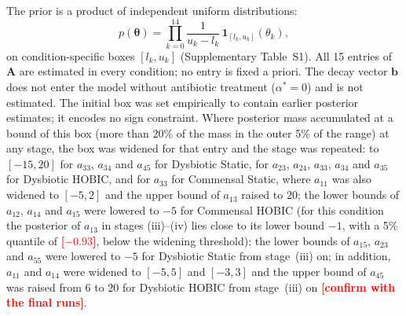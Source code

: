 \documentclass[11pt,a4paper]{article}
\newcommand{\btheta}{\boldsymbol{\theta}}
\newcommand{\TBD}[1]{\textcolor{red}{\textbf{[#1]}}}
\begin{document}
The prior is a product of independent uniform distributions:
\begin{equation}
p(\btheta) = \prod_{k=0}^{14} \frac{1}{u_k-l_k}\,\mathbf{1}_{[l_k,u_k]}(\theta_k),
\label{eq:prior}
\end{equation}
on condition-specific boxes $[l_k,u_k]$ (Supplementary Table~S1).
All 15 entries of $\mathbf{A}$ are estimated in every condition; no entry is fixed a priori.
The decay vector $\mathbf{b}$ does not enter the model without antibiotic treatment ($\alpha^*=0$) and is not estimated.
The initial box was set empirically to contain earlier posterior estimates; it encodes no sign constraint. Where posterior mass accumulated at a bound of this box (more than 20\% of the mass in the outer 5\% of the range) at any stage, the box was widened for that entry and the stage was repeated: to $[-15,20]$ for $a_{33}$, $a_{34}$ and $a_{45}$ for Dysbiotic Static, for $a_{23}$, $a_{24}$, $a_{33}$, $a_{34}$ and $a_{35}$ for Dysbiotic HOBIC, and for $a_{33}$ for Commensal Static, where $a_{11}$ was also widened to $[-5,2]$ and the upper bound of $a_{13}$ raised to $20$; the lower bounds of $a_{12}$, $a_{14}$ and $a_{15}$ were lowered to $-5$ for Commensal HOBIC (for this condition the posterior of $a_{13}$ in stages (iii)--(iv) lies close to its lower bound $-1$, with a 5\% quantile of \TBD{$-0.93$}, below the widening threshold); the lower bounds of $a_{15}$, $a_{23}$ and $a_{55}$ were lowered to $-5$ for Dysbiotic Static from stage~(iii) on; in addition, $a_{11}$ and $a_{14}$ were widened to $[-5,5]$ and $[-3,3]$ and the upper bound of $a_{45}$ was raised from $6$ to $20$ for Dysbiotic HOBIC from stage~(iii) on \TBD{confirm with the final runs}.
\end{document}
